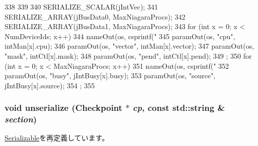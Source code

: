 \begin{DoxyCode}
338 {
339 
340     SERIALIZE_SCALAR(jIntVec);
341     SERIALIZE_ARRAY(jBusData0, MaxNiagaraProcs);
342     SERIALIZE_ARRAY(jBusData1, MaxNiagaraProcs);
343     for (int x = 0; x < NumDeviceIds; x++) {
344         nameOut(os, csprintf("%
345         paramOut(os, "cpu", intMan[x].cpu);
346         paramOut(os, "vector", intMan[x].vector);
347         paramOut(os, "mask", intCtl[x].mask);
348         paramOut(os, "pend", intCtl[x].pend);
349     };
350     for (int x = 0; x < MaxNiagaraProcs; x++) {
351         nameOut(os, csprintf("%
352         paramOut(os, "busy", jIntBusy[x].busy);
353         paramOut(os, "source", jIntBusy[x].source);
354     };
355 }
\end{DoxyCode}
\hypertarget{classIob_af22e5d6d660b97db37003ac61ac4ee49}{
\subsubsection[{unserialize}]{\setlength{\rightskip}{0pt plus 5cm}void unserialize ({\bf Checkpoint} $\ast$ {\em cp}, \/  const std::string \& {\em section})}}
\label{classIob_af22e5d6d660b97db37003ac61ac4ee49}


\hyperlink{classSerializable_af100c4e9feabf3cd918619c88c718387}{Serializable}を再定義しています。


